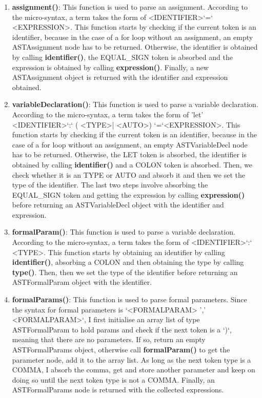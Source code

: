 \documentclass{article}
\begin{document}
\begin{enumerate}
				\item \textbf{assignment()}: This function is used to parse an assignment. According to the micro-syntax, a term takes the form of \textless IDENTIFIER\textgreater `=` \textless EXPRESSION\textgreater. This function starts by checking if the current token is an identifier, because in the case of a for loop without an assignment, an empty ASTAssignment node has to be returned. Otherwise, the identifier is obtained by calling \textbf{identifier()}, the EQUAL\_SIGN token is absorbed and the expression is obtained by calling \textbf{expression()}. Finally, a new ASTAssignment object is returned with the identifier and expression obtained.
							
				\item \textbf{variableDeclaration()}: This function is used to parse a variable declaration. According to the micro-syntax, a term takes the form of 'let' \textless IDENTIFIER\textgreater `:` ( \textless TYPE\textgreater | \textless AUTO\textgreater ) `=`\textless EXPRESSION\textgreater. This function starts by checking if the current token is an identifier, because in the case of a for loop without an assignment, an empty ASTVariableDecl node has to be returned. Otherwise, the LET token is absorbed, the identifier is obtained by calling \textbf{identifier()} and a COLON token is absorbed. Then, we check whether it is an TYPE or AUTO and absorb it and then we set the type of the identifier. The last two steps involve absorbing the EQUAL\_SIGN token and getting the expression by calling \textbf{expression()} before returning an ASTVariableDecl object with the identifier and expression.
				
				\item \textbf{formalParam()}: This function is used to parse a variable declaration. According to the micro-syntax, a term takes the form of \textless IDENTIFIER\textgreater `:` \textless TYPE\textgreater . This function starts by obtaining an identifier by calling \textbf{identifier()}, absorbing a COLON and then obtaining the type by calling \textbf{type()}. Then, then we set the type of the identifier before returning an ASTFormalParam object with the identifier.		
				
						\item \textbf{formalParams()}: This function is used to parse formal parameters. Since the syntax for formal parameters is `\textless FORMALPARAM\textgreater { ',' \textless FORMALPARAM\textgreater }`, I first initialise an array list of type ASTFormalParam to hold params and check if the next token is a `)`, meaning that there are no parameters. If so, return an empty ASTFormalParams object, otherwise call \textbf{formalParam()} to get the parameter node, add it to the array list. As long as the next token type is a COMMA, I absorb the comma, get and store another parameter and keep on doing so until the next token type is not a COMMA. Finally, an ASTFormalParams node is returned with the collected expressions.
							

\end{enumerate}
\end{document}

